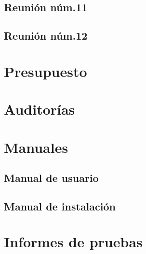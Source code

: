\documentclass[10pt,spanish]{article}
\begin{document}
\subsection{Reunión núm.11}

\blindtext
\subsection{Reunión núm.12}

\blindtext

\section{Presupuesto}

\blindtext

\section{Auditorías}

\blindtext

\section{Manuales}

\blindtext
\subsection{Manual de usuario}

\blindtext
\subsection{Manual de instalación}

\blindtext

\section{Informes de pruebas}

\blindtext
\end{document}
